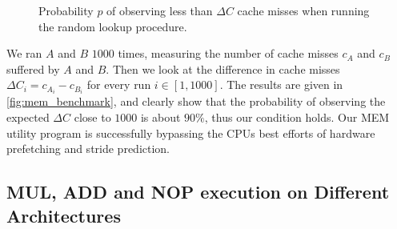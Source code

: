 \begin{figure}
    \centering
    \caption{Probability \(p\) of observing less than \(\Delta C\) cache misses when running the random lookup procedure.}
    \label{fig:mem_benchmark}
\end{figure}



We ran \(A\) and \(B\) \(1000\) times, measuring the number of cache misses \(c_A\) and \(c_B\) suffered by \(A\) and \(B\).
Then we look at the difference in cache misses \(\Delta C_i = c_{A_i} - c_{B_i}\) for every run \(i \in [1, 1000]\). 
The results are given in \autoref{fig:mem_benchmark}, and clearly show that the probability of observing the expected \(\Delta C\) close to \(1000\) is about \(90\%\), thus our condition holds.
Our MEM utility program is successfully bypassing the CPUs best efforts of hardware prefetching and stride prediction.

\subsection{MUL, ADD and NOP execution on Different Architectures}
\label{chp4:subsec:MUL_ADD_NOP_instructions}

